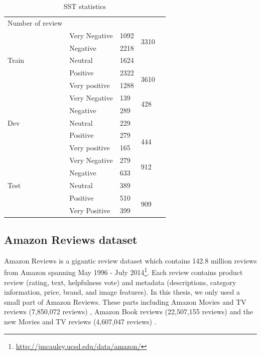 \begin{table}[H]
	\centering
	\caption{SST statistics}
	\label{table:sststatistic}
	\begin{tabular}{lllll}
		Number of review       &               &      &                       &  \\ \cline{1-4}
		\multirow{5}{*}{Train} & Very Negative & 1092 & \multirow{2}{*}{3310} &  \\ \cline{2-3}
		& Negative      & 2218 &                       &  \\ \cline{2-4}
		& Neutral       & 1624 &                       &  \\ \cline{2-4}
		& Positive      & 2322 & \multirow{2}{*}{3610} &  \\ \cline{2-3}
		& Very positive & 1288 &                       &  \\ \cline{1-4}
		\multirow{5}{*}{Dev}   & Very Negative & 139  & \multirow{2}{*}{428}  &  \\ \cline{2-3}
		& Negative      & 289  &                       &  \\ \cline{2-4}
		& Neutral       & 229  &                       &  \\ \cline{2-4}
		& Positive      & 279  & \multirow{2}{*}{444}  &  \\ \cline{2-3}
		& Very positive & 165  &                       &  \\ \cline{1-4}
		\multirow{5}{*}{Test}  & Very Negative & 279  & \multirow{2}{*}{912}  &  \\ \cline{2-3}
		& Negative      & 633  &                       &  \\ \cline{2-4}
		& Neutral       & 389  &                       &  \\ \cline{2-4}
		& Positive      & 510  & \multirow{2}{*}{909}  &  \\ \cline{2-3}
		& Very Positive & 399  &                       &  \\ \cline{2-4}
	\end{tabular}
\end{table}

\subsection{Amazon Reviews dataset}\label{sec:amazon}
Amazon Reviews is a gigantic review dataset
which contains 142.8 million reviews from Amazon spanning May 1996 - July 2014\footnote{\url{http://jmcauley.ucsd.edu/data/amazon/}}.
Each review contains product review (rating, text, helpfulness vote) and metadata (descriptions, category information, price, brand, and image features)\cite{amazon-reviews}.
In this thesis, we only used a small part of Amazon Reviews.
These parts including Amazon Movies and TV reviews (7,850,072 reviews) \cite{mcauley2013hidden}, Amazon Book reviews (22,507,155 reviews) and the new Movies and TV reviews (4,607,047 reviews) \cite{McAuleyTSH15}\cite{HeM16}. 

